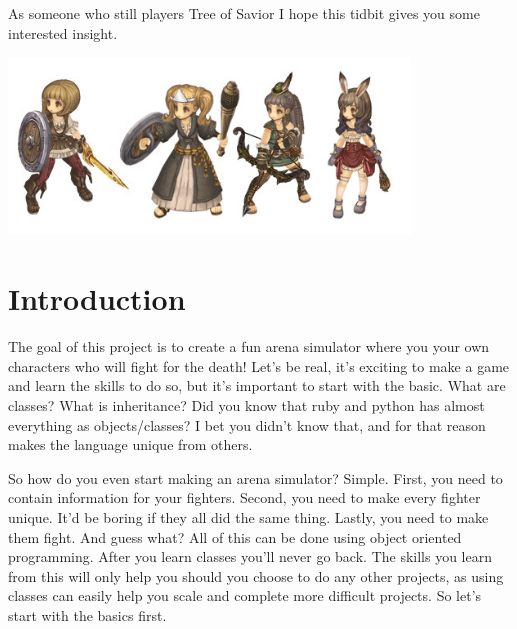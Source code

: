\documentclass{42-en}
\begin{document}
	As someone who still players Tree of Savior I hope this tidbit gives you some
	interested insight.

	\begin{center}
		\includegraphics[width=0.8\textwidth]{images/classes.jpg}
	\end{center}

\chapter{Introduction}

	The goal of this project is to create a fun arena simulator where you
	your own characters who will fight for the death! Let's be real,
	it's exciting to make a game and learn the skills to do so, but it's
	important to start with the basic. What are classes? What is inheritance?
	Did you know that ruby and python has almost everything as objects/classes?
	I bet you didn't know that, and for that reason makes the language unique
	from others.\\


	So how do you even start making an arena simulator? Simple. First, you
	need to contain information for your fighters. Second, you need to make
	every fighter unique. It'd be boring if they all did the same thing. 
	Lastly, you need to make them fight. And guess what? All of this can be done
	using object oriented programming. After you learn classes you'll never
	go back. The skills you learn from this will only help you should you choose
	to do any other projects, as using classes can easily help you scale
	and complete more difficult projects. So let's start with the basics first.\\
\end{document}
